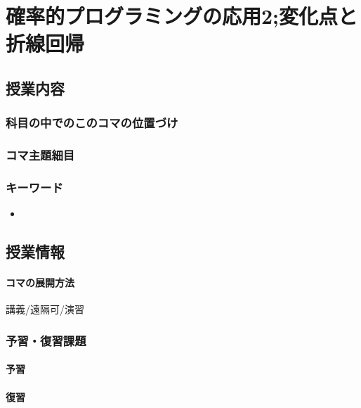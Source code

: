 \section{確率的プログラミングの応用2;変化点と折線回帰}
\subsection{授業内容}
\subsubsection{科目の中でのこのコマの位置づけ}
\subsubsection{コマ主題細目}
\begin{description}
    \item[]
\end{description}
\subsubsection{キーワード}
\begin{itemize}
    \item
\end{itemize}
\subsection{授業情報}
\paragraph{コマの展開方法}
講義/遠隔可/演習
\subsubsection{予習・復習課題}
\paragraph{予習}
\paragraph{復習}